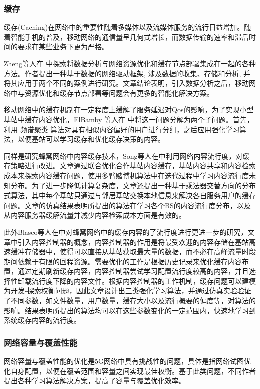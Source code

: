 ﻿\documentclass[11pt,draftclsnofoot,onecolumn,journal,letterpaper]{IEEEtran}
\begin{document}
\subsubsection{缓存}

缓存(Caching)在网络中的重要性随着多媒体以及流媒体服务的流行日益增加。随着智能手机的普及，移动网络的通信量呈几何式增长，而数据传输的速率和滞后时间的要求在某些业务下更为严格。

Zheng等人在\cite{Zheng2016} 中探索将数据分析与网络资源优化和缓存节点部署集成在一起的各种方法。作者提出一种基于数据的网络驱动框架, 涉及数据的收集、存储和分析, 并将其应用于两个不同的案例进行研究。文章结论表明，引入数据分析之后，移动网络中与资源优化和缓存节点部署等问题会有更多的智能化解决方案。

移动网络中的缓存机制在一定程度上缓解了服务延迟对Qos的影响，为了实现小型基站中缓存内容优化，ElBamby 等人在
\cite{ElBamby2014}中将这一问题分解为两个子问题。首先，利用 频谱聚类 算法对具有相似内容偏好的用户进行分组，之后应用强化学习算法，以便基站可以学习缓存和优化缓存决策的内容。

同样是研究蜂窝网络中内容缓存技术，Song等人在\cite{Song2017}中利用网络内容流行度，对缓存策略进行改进。文章通过联合优化合作基站内容缓存，基站内容共享和内容检索成本来探索内容缓存问题，使用多臂赌博机算法中在迭代过程中学习内容流行度未知分布。为了进一步降低计算复杂度，文章还提出一种基于乘法器交替方向的分布式算法，其中每个基站只通过与邻居基站交换本地信息来解决各自服务用户的缓存问题。文章的仿真结果表明所提出的算法在学习各个BS的内容流行度分布，以及从内容服务器缓解流量并减少内容检索成本方面是有效的。

此外Blasco等人在\cite{Blasco2014}中对蜂窝网络中的缓存内容的了流行度进行更进一步的研究，文章中引入内容控制器的概念，内容控制器的作用是将最受欢迎的内容存储在基站高速缓冲存储器中，使得可以直接从基站获取最大量的数据，而不必在高峰流量时段期间依赖于有限的回程资源。需要优化的工作是根据历史记录来优化缓存内容布置，通过定期刷新缓存内容，内容控制器尝试学习配置流行度较高的内容，并且选择性卸载流行度下降的内容文件。根据内容控制器的工作机制，缓存问题可以建模为开发-探索权衡问题，因此文章设计出三类强化学习算法，并通过仿真实验验证了不同参数，如文件数量，用户数量，缓存大小以及流行概要的偏度等，对算法的影响。结果表明所提出的算法均可以在这些参数变化的一定范围内，快速地学习到系统缓存内容的流行度。



\subsubsection{网络容量与覆盖性能}
网络容量与覆盖性能的优化是5G网络中具有挑战性的问题，具体是指网络试图优化自身配置，以便在覆盖范围和容量之间实现最佳权衡。基于此类问题，不同作者提出各种学习算法解决方案，提高了容量与覆盖优化效率。
\end{document}
